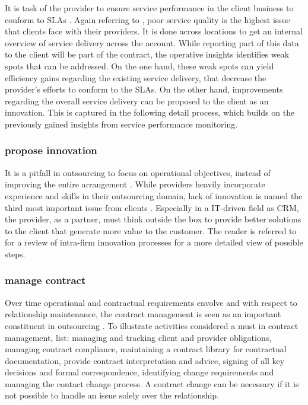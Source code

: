 	It is task of the provider to ensure service performance in the client business to conform to \acrshort{SLA}s \cite{deloittehandbook}. Again referring to \citep{deloitte2014outsourcing}, poor service quality is the highest issue that clients face with their providers. It is done across locations to get an internal overview of service delivery across the account. While reporting part of this data to the client will be part of the contract, the operative insights identifies weak spots that can be addressed. On the one hand, these weak spots can yield efficiency gains regarding the existing service delivery, that decrease the provider's efforts to conform to the \acrshort{SLA}s. On the other hand, improvements regarding the overall service delivery can be proposed to the client as an innovation. This is captured in the following detail process, which builds on the previously gained insights from service performance monitoring. 
	
	\subsubsection{propose innovation}
	
	It is a pitfall in outsourcing to focus on operational objectives, instead of improving the entire arrangement \citep{deloittehandbook}. While providers heavily incorporate experience and skills in their outsourcing domain, lack of innovation is named the third most important issue from clients \citep{deloitte2014outsourcing}. Especially in a IT-driven field as \acrshort{CRM}, the provider, as a partner, must think outside the box to provide better solutions to the client that generate more value to the customer. The reader is referred to \citep{Saren_1984} for a review of intra-firm innovation processes for a more detailed view of possible steps. 
	
	\subsubsection{manage contract}
	
	Over time operational and contractual requirements envolve and with respect to relationship maintenance, the contract management is seen as an important constituent in outsourcing \citep{Franceschini_2003, perunovic2007outsourcing}. To illustrate activities considered a must in contract management, \citep[]{deloittehandbook} list: managing and tracking client and provider obligations, managing contract compliance, maintaining a contract library for contractual documentation, provide contract interpretation and advice, signing of all key decisions and formal correspondence, identifying change requirements and managing the contact change process. A contract change can be necessary if it is not possible to handle an issue solely over the relationship. 
	
